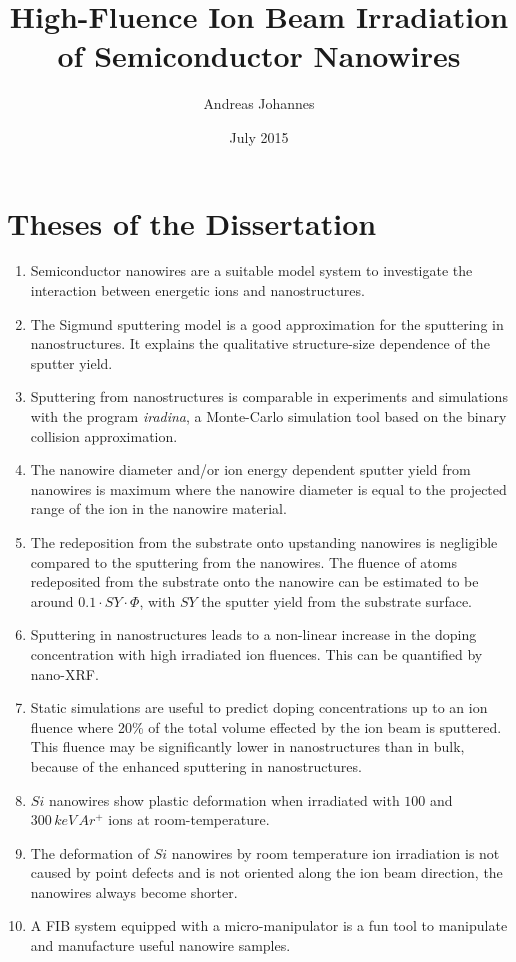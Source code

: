 \titlehead{Friedrich Schiller Universität Jena\\
PAF}
\subject{Dissertation}
\title{High-Fluence Ion Beam Irradiation of Semiconductor Nanowires}
\author{Andreas Johannes}
\date{July 2015}
\maketitle


\vspace*{-4cm}\section*{Theses of the Dissertation}

\setcounter{page}{1}


\begin{enumerate}
\item{Semiconductor nanowires are a suitable model system to investigate the interaction between energetic ions and nanostructures.}
\item{The Sigmund sputtering model is a good approximation for the sputtering in nanostructures. It explains the qualitative structure-size dependence of the sputter yield.}
\item{Sputtering from nanostructures is comparable in experiments and simulations with the program \emph{iradina}, a Monte-Carlo simulation tool based on the binary collision approximation.}
\item{The nanowire diameter and/or ion energy dependent sputter yield from nanowires is maximum where the nanowire diameter is equal to the projected range of the ion in the nanowire material.}
\item{The redeposition from the substrate onto upstanding nanowires is negligible compared to the sputtering from the nanowires. The fluence of atoms redeposited from the substrate onto the nanowire can be estimated to be around $0.1\cdot SY \cdot \Phi$, with $SY$ the sputter yield from the substrate surface.}
\item{Sputtering in nanostructures leads to a non-linear increase in the doping concentration with high irradiated ion fluences. This can be quantified by nano-XRF.}
\item{Static simulations are useful to predict doping concentrations up to an ion fluence where 20\% of the total volume effected by the ion beam is sputtered. This fluence may be significantly lower in nanostructures than in bulk, because of the enhanced sputtering in nanostructures.}
\item{$Si$ nanowires show plastic deformation when irradiated with $100$ and $300\,keV\,Ar^+$ ions at room-temperature.} 
\item{The deformation of $Si$ nanowires by room temperature ion irradiation is not caused by point defects and is not oriented along the ion beam direction, the nanowires always become shorter.}
\item{A FIB system equipped with a micro-manipulator is a fun tool to manipulate and manufacture useful nanowire samples.}

\end{enumerate}

